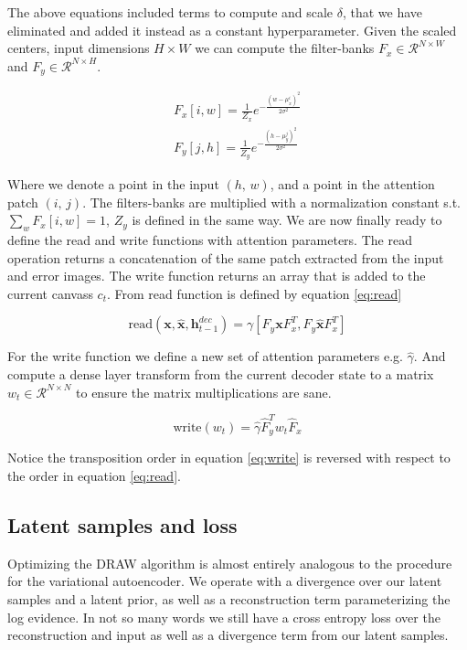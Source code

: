 \noindent The above equations included terms to compute and scale $\delta$, that we have eliminated and added it instead as a constant hyperparameter. Given the scaled centers, input dimensions $H \times W$ we can compute the filter-banks $F_x \in \mathcal{R}^{N \times W}$ and $F_y \in \mathcal{R}^{N \times H}$.

\begin{align}
F_x [i, w] = \frac{1}{Z_x}e^{-\frac{(w - \mu_x^i)^2}{2\sigma^2}}\label{eq:Fx} \\
F_y [j, h] = \frac{1}{Z_y}e^{-\frac{(h - \mu_y^j)^2}{2\sigma^2}}\label{eq:Fy}
\end{align}

\noindent Where we denote a point in the input $(h,\, w)$, and a point in the attention patch $(i,\, j)$. The filters-banks are multiplied with a normalization constant s.t. $\sum_w F_x[i, w] = 1$, $Z_y$ is defined in the same way. We are now finally ready to define the read and write functions with attention parameters. The read operation returns a concatenation of the same patch extracted from the input and error images. The write function returns an array that is added to the current canvass $c_t$. From \citet{Gregor2015} read function is defined by equation \ref{eq:read}

\begin{equation}\label{eq:read}
\text{read}(\mathbf{x}, \mathbf{\hat{x}}, \mathbf{h}_{t-1}^{dec}) = \gamma[F_y \mathbf{x} F_x^T, F_y \mathbf{\hat{x}} F_x^T]
\end{equation} 

\noindent For the write function we define a new set of attention parameters e.g. $\hat{\gamma}$. And compute a dense layer transform from the current decoder state to a matrix $w_t \in \mathcal{R}^{N \times N}$ to ensure the matrix multiplications are sane. 

\begin{equation}\label{eq:write}
\text{write}(w_t)  = \hat{\gamma} \hat{F}^T_y w_t \hat{F}_x
\end{equation}

\noindent Notice the transposition order in equation \ref{eq:write} is reversed with respect to the order in equation \ref{eq:read}. 

\subsection{Latent samples and loss}

Optimizing the DRAW algorithm is almost entirely analogous to the procedure for the variational autoencoder. We operate with a divergence over our latent samples and a latent prior, as well as a reconstruction term parameterizing the log evidence. In not so many words we still have a cross entropy loss over the reconstruction and input as well as a divergence term from our latent samples.  

